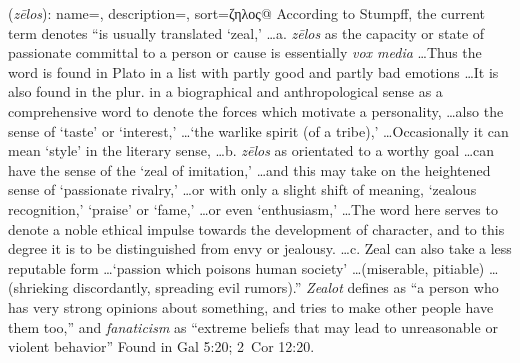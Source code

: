 \item[Fanaticism,]

(\textit{zēlos}):
{
    name=,
    description={},
    sort=ζηλος@
}
According to Stumpff, the current term denotes ``is usually translated `zeal,' \ldots a. \emph{zēlos} as the capacity or state of passionate committal to a person or cause is essentially \emph{vox media} \ldots Thus the word is found in Plato in a list with partly good and partly bad emotions \ldots It is also found in the plur. in a biographical and anthropological sense as a comprehensive word to denote the forces which motivate a personality, \ldots also the sense of `taste' or `interest,' \ldots `the warlike spirit (of a tribe),' \ldots Occasionally it can mean `style' in the literary sense, \ldots b. \emph{zēlos} as orientated to a worthy goal \ldots can have the sense of  the `zeal of imitation,' \ldots and this may take on the heightened sense of `passionate rivalry,' \ldots or with only a slight shift of meaning, `zealous recognition,' `praise' or `fame,' \ldots or even `enthusiasm,' \ldots The word here serves  to denote a noble ethical impulse towards the development of character, and to this degree it is to be distinguished from envy or jealousy. \ldots c. Zeal can also take a less reputable form \ldots `passion which poisons human society' \ldots (miserable, pitiable) \ldots (shrieking discordantly, spreading evil rumors).''
\emph{Zealot} defines as ``a person who has very strong opinions about something, and tries to make other people have them too,'' and \emph{fanaticism} as ``extreme beliefs that may lead to unreasonable or violent behavior''
Found in Gal 5:20; 2~Cor 12:20.
